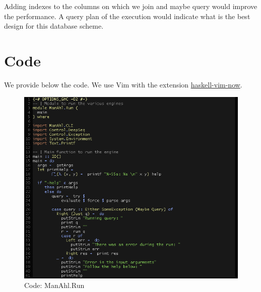 \documentclass[12pt,a4paper,article]{memoir} %
\begin{document}
Adding indexes to the columns on which we join and maybe query would improve 
the performance. 
A query plan of the execution would indicate what is the best design for this 
database scheme.


\newpage
\appendix
{}

\chapter{Code} \label{apx:code}
We provide below the code. We use Vim with the extension 
\href{https://github.com/begriffs/haskell-vim-now}{haskell-vim-now}.
\begin{figure}[h!]
\centering
\includegraphics[width=1\textwidth]{img/code-run.png}
\caption{Code: ManAhl.Run}
\label{fig:core.run}
\end{figure}
\end{document}
